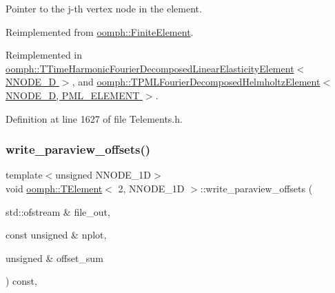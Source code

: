 Pointer to the j-\/th vertex node in the element. 



Reimplemented from \hyperlink{classoomph_1_1FiniteElement_a863c4382c879a77ad5607c6f9781c761}{oomph\+::\+Finite\+Element}.



Reimplemented in \hyperlink{classoomph_1_1TTimeHarmonicFourierDecomposedLinearElasticityElement_ad02188b226cc083ee4712a2dd51739ba}{oomph\+::\+T\+Time\+Harmonic\+Fourier\+Decomposed\+Linear\+Elasticity\+Element$<$ N\+N\+O\+D\+E\+\_\+D $>$}, and \hyperlink{classoomph_1_1TPMLFourierDecomposedHelmholtzElement_a1060503e32a25da08137cf9203dd721f}{oomph\+::\+T\+P\+M\+L\+Fourier\+Decomposed\+Helmholtz\+Element$<$ N\+N\+O\+D\+E\+\_\+D, P\+M\+L\+\_\+\+E\+L\+E\+M\+E\+N\+T $>$}.



Definition at line 1627 of file Telements.\+h.

\mbox{\label{classoomph_1_1TElement_3_012_00_01NNODE__1D_01_4_a33b8548c4cdd2c28f663d47a5e616487}} 
\subsubsection{\texorpdfstring{write\+\_\+paraview\+\_\+offsets()}{write\_paraview\_offsets()}}
{\footnotesize\ttfamily template$<$unsigned N\+N\+O\+D\+E\+\_\+1D$>$ \\
void \hyperlink{classoomph_1_1TElement}{oomph\+::\+T\+Element}$<$ 2, N\+N\+O\+D\+E\+\_\+1D $>$\+::write\+\_\+paraview\+\_\+offsets (\begin{DoxyParamCaption}\item[{std\+::ofstream \&}]{file\+\_\+out,  }\item[{const unsigned \&}]{nplot,  }\item[{unsigned \&}]{offset\+\_\+sum }\end{DoxyParamCaption}) const\hspace{0.3cm}{\ttfamily [inline]}, {\ttfamily [virtual]}}



